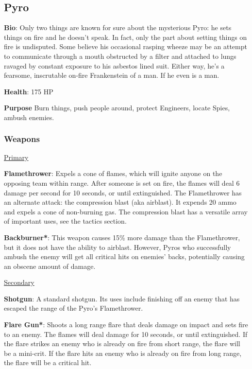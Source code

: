 \subsection{Pyro}
\label{Pyro}
{\bf Bio}:
Only two things are known for sure about the mysterious Pyro: he sets things on fire and he doesn't speak. In fact, only the part about setting things on fire is undisputed. Some believe his occasional rasping wheeze may be an attempt to communicate through a mouth obstructed by a filter and attached to lungs ravaged by constant exposure to his asbestos lined suit. Either way, he's a fearsome, inscrutable on-fire Frankenstein of a man. If he even is a man.

{\bf Health}: 175 HP

{\bf Purpose}
Burn things, push people around, protect Engineers, locate Spies, ambush enemies.

\subsubsection {Weapons}

\begin {center}
\underline {Primary}
\end {center}

{\bf Flamethrower}: Expels a cone of flames, which will ignite anyone on the opposing team within range. After someone is set on fire, the flames will deal 6 damage per second for 10 seconds, or until extinguished. The Flamethrower has an alternate attack: the compression blast (aka airblast). It expends 20 ammo and expels a cone of non-burning gas. The compression blast has a versatile array of important uses, see the tactics section.

{\bf Backburner*}: This weapon causes 15\% more damage than the Flamethrower, but it does not have the ability to airblast. However, Pyros who successfully ambush the enemy will get all critical hits on enemies' backs, potentially causing an obscene amount of damage. 


\begin {center}
\underline {Secondary}
\end {center}

{\bf Shotgun}: A standard shotgun. Its uses include finishing off an enemy that has escaped the range of the Pyro's Flamethrower.

{\bf Flare Gun*}: Shoots a long range flare that deals damage on impact and sets fire to an enemy. The flames will deal damage for 10 seconds, or until extinguished. If the flare strikes an enemy who is already on fire from short range, the flare will be a mini-crit. If the flare hits an enemy who is already on fire from long range, the flare will be a critical hit.

